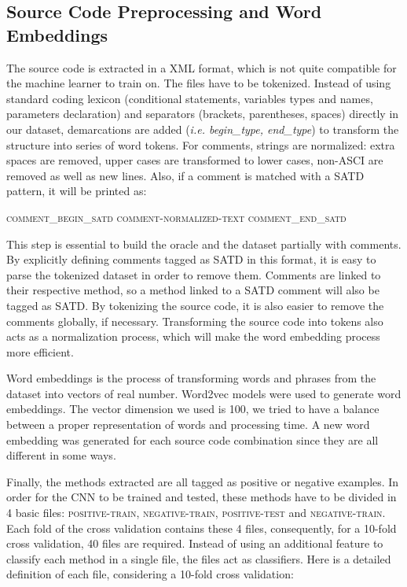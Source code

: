 \subsection{Source Code Preprocessing and Word Embeddings}


The source code is extracted in a XML format, which is not quite compatible for the machine learner to train on. The files have to be tokenized. Instead of using standard coding lexicon (conditional statements, variables types and names, parameters declaration) and separators (brackets, parentheses, spaces) directly in our dataset, demarcations are added (\textit{i.e. begin\_type, end\_type}) to transform the structure into series of word tokens. For comments, strings are normalized: extra spaces are removed, upper cases are transformed to lower cases, non-ASCI are removed as well as new lines. Also, if a comment is matched with a SATD pattern, it will be printed as:

\textsc{comment\_begin\_satd    comment-normalized-text    comment\_end\_satd}

This step is essential to build the oracle and the dataset partially with comments. By explicitly defining comments tagged as SATD in this format, it is easy to parse the tokenized dataset in order to remove them. Comments are linked to their respective method, so a method linked to a SATD comment will also be tagged as SATD. By tokenizing the source code, it is also easier to remove the comments globally, if necessary. Transforming the source code into tokens also acts as a normalization process, which will make the word embedding process more efficient.

Word embeddings is the process of transforming words and phrases from the dataset into vectors of real number. Word2vec models were used to generate word embeddings. The vector dimension we used is 100, we tried to have a balance between a proper representation of words and processing time. A new word embedding was generated for each source code combination since they are all different in some ways.

Finally, the methods extracted are all tagged as positive or negative examples. In order for the CNN to be trained and tested, these methods have to be divided in 4 basic files: \textsc{positive-train}, \textsc{negative-train}, \textsc{positive-test} and \textsc{negative-train}. Each fold of the cross validation contains these 4 files, consequently, for a 10-fold cross validation, 40 files are required. Instead of using an additional feature to classify each method in a single file, the files act as classifiers. Here is a detailed definition of each file, considering a 10-fold cross validation:

